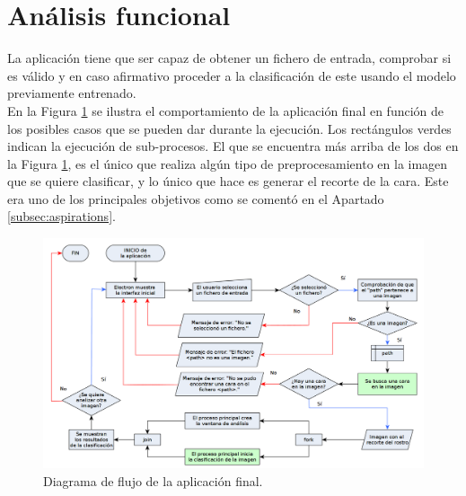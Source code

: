 \documentclass[a4paper,11pt]{book}
\begin{document}
\section{Análisis funcional}




La aplicación tiene que ser capaz de obtener un fichero de entrada, comprobar si es válido y en caso afirmativo proceder a la clasificación de este usando el modelo previamente entrenado.\\
En la Figura \ref{fig:appFlowchart} se ilustra el comportamiento de la aplicación final en función de los posibles casos que se pueden dar durante la ejecución. Los rectángulos verdes indican la ejecución de sub-procesos. El que se encuentra más arriba de los dos en la Figura \ref{fig:appFlowchart}, es el único que realiza algún tipo de preprocesamiento en la imagen que se quiere clasificar, y lo único que hace es generar el recorte de la cara. Este era uno de los principales objetivos como se comentó en el Apartado \ref{subsec:aspirations}.
\begin{figure}[t]
\centering
\includegraphics[width=1.0\linewidth]{imagenes/appFlowchart}
\caption[FlowChart]{Diagrama de flujo de la aplicación final.}
\label{fig:appFlowchart}
\end{figure}
\end{document}
